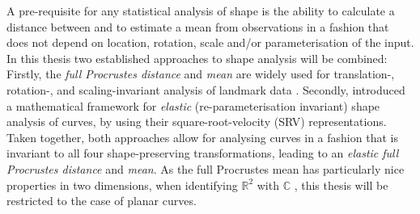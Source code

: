 A pre-requisite for any statistical analysis of shape is the ability to calculate a distance between and to estimate a mean from observations in a fashion that does not depend on location, rotation, scale and/or parameterisation of the input.
In this thesis two established approaches to shape analysis will be combined:
Firstly, the \emph{full Procrustes distance} and \emph{mean} are widely used for translation-, rotation-, and scaling-invariant analysis of landmark data \parencite[see e.g.][Chap.\ 4,\ 6]{DrydenMardia2016}.
Secondly, \cite{SrivastavaEtAl2011} introduced a mathematical framework for \emph{elastic} (re-parameterisation invariant) shape analysis of curves, by using their square-root-velocity (SRV) representations.
Taken together, both approaches allow for analysing curves in a fashion that is invariant to all four shape-preserving transformations, leading to an \emph{elastic full Procrustes distance} and \emph{mean}.
As the full Procrustes mean has particularly nice properties in two dimensions, when identifying $\mathbb{R}^2$ with $\mathbb{C}$ \parencite[see][Chap.\ 8]{DrydenMardia2016}, this thesis will be restricted to the case of planar curves.


